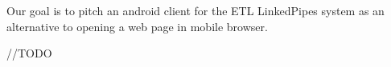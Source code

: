 Our goal is to pitch an android client for the ETL LinkedPipes system as an alternative to opening a web page in mobile browser.

//TODO